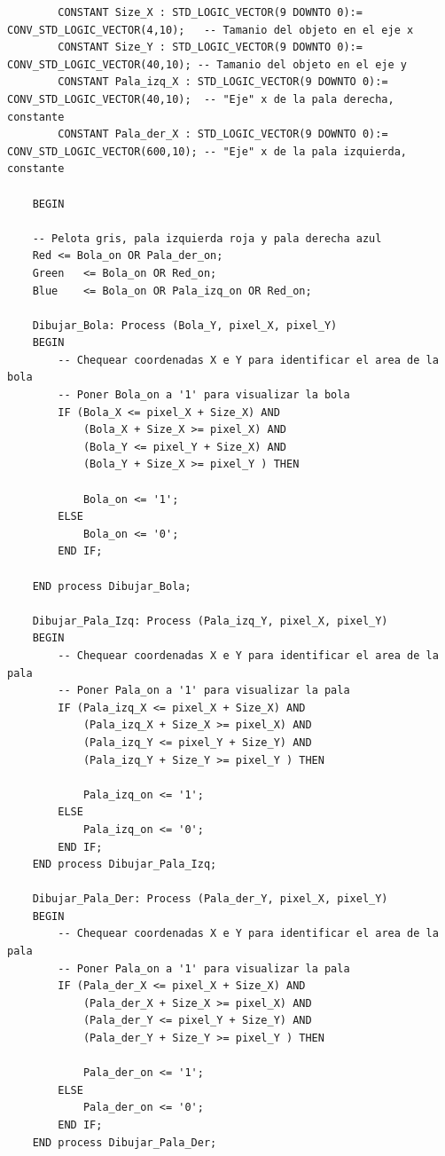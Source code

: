 \begin{lstlisting}
        CONSTANT Size_X : STD_LOGIC_VECTOR(9 DOWNTO 0):= CONV_STD_LOGIC_VECTOR(4,10);	-- Tamanio del objeto en el eje x
        CONSTANT Size_Y : STD_LOGIC_VECTOR(9 DOWNTO 0):= CONV_STD_LOGIC_VECTOR(40,10); -- Tamanio del objeto en el eje y
        CONSTANT Pala_izq_X : STD_LOGIC_VECTOR(9 DOWNTO 0):= CONV_STD_LOGIC_VECTOR(40,10);	-- "Eje" x de la pala derecha, constante
        CONSTANT Pala_der_X : STD_LOGIC_VECTOR(9 DOWNTO 0):= CONV_STD_LOGIC_VECTOR(600,10);	-- "Eje" x de la pala izquierda, constante
        
    BEGIN
    
    -- Pelota gris, pala izquierda roja y pala derecha azul
    Red	<= Bola_on OR Pala_der_on;
    Green	<= Bola_on OR Red_on;
    Blue	<= Bola_on OR Pala_izq_on OR Red_on;
    
    Dibujar_Bola: Process (Bola_Y, pixel_X, pixel_Y)
    BEGIN
        -- Chequear coordenadas X e Y para identificar el area de la bola
        -- Poner Bola_on a '1' para visualizar la bola
        IF (Bola_X <= pixel_X + Size_X) AND
            (Bola_X + Size_X >= pixel_X) AND
            (Bola_Y <= pixel_Y + Size_X) AND
            (Bola_Y + Size_X >= pixel_Y ) THEN
            
            Bola_on <= '1';
        ELSE
            Bola_on <= '0';
        END IF;
        
    END process Dibujar_Bola;
    
    Dibujar_Pala_Izq: Process (Pala_izq_Y, pixel_X, pixel_Y)
    BEGIN
        -- Chequear coordenadas X e Y para identificar el area de la pala
        -- Poner Pala_on a '1' para visualizar la pala
        IF (Pala_izq_X <= pixel_X + Size_X) AND
            (Pala_izq_X + Size_X >= pixel_X) AND
            (Pala_izq_Y <= pixel_Y + Size_Y) AND
            (Pala_izq_Y + Size_Y >= pixel_Y ) THEN
            
            Pala_izq_on <= '1';
        ELSE
            Pala_izq_on <= '0';
        END IF;
    END process Dibujar_Pala_Izq;
    
    Dibujar_Pala_Der: Process (Pala_der_Y, pixel_X, pixel_Y)
    BEGIN
        -- Chequear coordenadas X e Y para identificar el area de la pala
        -- Poner Pala_on a '1' para visualizar la pala
        IF (Pala_der_X <= pixel_X + Size_X) AND
            (Pala_der_X + Size_X >= pixel_X) AND
            (Pala_der_Y <= pixel_Y + Size_Y) AND
            (Pala_der_Y + Size_Y >= pixel_Y ) THEN
            
            Pala_der_on <= '1';
        ELSE
            Pala_der_on <= '0';
        END IF;
    END process Dibujar_Pala_Der;
    

\end{lstlisting}
